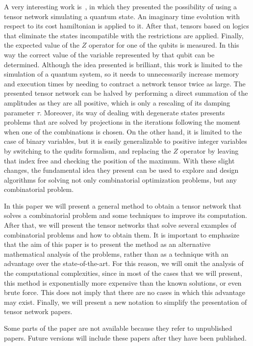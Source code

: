 A very interesting work is~\cite{TN_Constraint}, in which they presented the possibility of using a tensor network simulating a quantum state. An imaginary time evolution with respect to its cost hamiltonian is applied to it. After that, tensors based on logics that eliminate the states incompatible with the restrictions are applied. Finally, the expected value of the $Z$ operator for one of the qubits is measured. In this way the correct value of the variable represented by that qubit can be determined. Although the idea presented is brilliant, this work is limited to the simulation of a quantum system, so it needs to unnecessarily increase memory and execution times by needing to contract a network tensor twice as large. The presented tensor network can be halved by performing a direct summation of the amplitudes as they are all positive, which is only a rescaling of its damping parameter $\tau$. Moreover, its way of dealing with degenerate states presents problems that are solved by projections in the iterations following the moment when one of the combinations is chosen. On the other hand, it is limited to the case of binary variables, but it is easily generalizable to positive integer variables by switching to the qudits formalism, and replacing the $Z$ operator by leaving that index free and checking
the position of the maximum. With these slight changes, the fundamental idea they present can be used to explore and design algorithms for solving not only combinatorial optimization problems, but any combinatorial problem.

In this paper we will present a general method to obtain a tensor network that solves a combinatorial problem and some techniques to improve its computation. After that, we will present the tensor networks that solve several examples of combinatorial problems and how to obtain them. It is important to emphasize that the aim of this paper is to present the method as an alternative mathematical analysis of the problems, rather than as a technique with an advantage over the state-of-the-art. For this reason, we will omit the analysis of the computational complexities, since in most of the cases that we will present, this method is exponentially more expensive than the known solutions, or even brute force. This does not imply that there are no cases in which this advantage may exist. Finally, we will present a new notation to simplify the presentation of tensor network papers.

Some parts of the paper are not available because they refer to unpublished papers. Future versions will include these papers after they have been published.